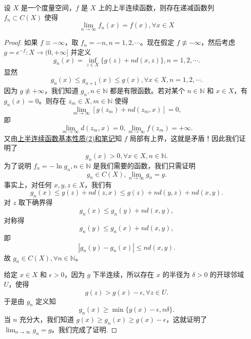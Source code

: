 \documentclass[../../main.tex]{subfiles}
\begin{document}
\begin{theorem}[半连续函数逼近定理]\label{theorem:半连续函数逼近定理}
设 \(X\) 是一个度量空间，\(f\) 是 \(X\) 上的上半连续函数，则存在递减函数列 \(f_{n} \subset C(X)\) 使得
\[
\lim_{n \to \infty} f_{n}(x)=f(x),\forall x \in X
\]
\end{theorem}
\begin{proof}
如果 \(f\equiv -\infty\)，取 \(f_{n}=-n,n = 1,2,\cdots\)。现在假定 \(f\not\equiv -\infty\)，然后考虑 \(g = e^{-f}:X\to(0,+\infty]\) 并定义
\[
g_{n}(x)=\inf_{z\in X}\{g(z)+nd(x,z)\},n = 1,2,\cdots.
\]
显然
\[
g_{n}(x)\leq g_{n + 1}(x)\leq g(x),\forall x\in X,n = 1,2,\cdots.
\]
因为 \(g\not\equiv+\infty\)，我们知道 \(g_{n},n\in\mathbb{N}\) 都是有限函数。若对某个 \(n\in\mathbb{N}\) 和 \(x\in X\)，有 \(g_{n}(x)=0\)。则存在 \(z_{m}\in X,m\in\mathbb{N}\) 使得
\[
\lim_{m\to\infty}[g(z_{m})+nd(z_{m},x)] = 0,
\]
即
\[
\lim_{m\to\infty}d(z_{m},x)=0,\lim_{m\to\infty}f(z_{m})=+\infty.
\]
又由\hyperref[proposition:半连续函数基本性质]{上半连续函数基本性质(2)和笔记}知 \(f\) 局部有上界，这就是矛盾！因此我们证明了
\[
g_{n}(x)>0,\forall x\in X,n\in\mathbb{N}.
\]
为了说明 \(f_{n}=-\ln g_{n},n\in\mathbb{N}\) 是我们需要的函数，我们只需证明
\[
g_{n}\in C(X),\lim_{n\to\infty}g_{n}=g.
\]
事实上，对任何 \(x,y,z\in X\)，我们有
\[
g_{n}(x)\leq g(z)+nd(z,x)\leq g(z)+nd(y,z)+nd(x,y).
\]
对 \(z\) 取下确界得
\[
g_{n}(x)\leq g_{n}(y)+nd(x,y),
\]
对称得
\[
g_{n}(y)\leq g_{n}(x)+nd(x,y),
\]
即
\[
|g_{n}(y)-g_{n}(x)|\leq nd(x,y).
\]
故 \(g_{n}\in C(X),\forall n\in\mathbb{N}\)。

给定 \(x\in X\) 和 \(\epsilon>0\)，因为 \(g\) 下半连续，所以存在 \(x\) 的半径为 \(\delta>0\) 的开球邻域 \(U\)，使得
\[
g(z)>g(x)-\epsilon,\forall z\in U.
\]
于是由 \(g_{n}\) 定义知
\[
g_{n}(x)\geq\min\{g(x)-\epsilon,n\delta\}.
\]
当 \(n\) 充分大，我们知道 \(g(x)\geq g_{n}(x)\geq g(x)-\epsilon\)，这就证明了 \(\lim_{n\to\infty}g_{n}=g\)。我们完成了证明.
\end{proof}
\end{document}
